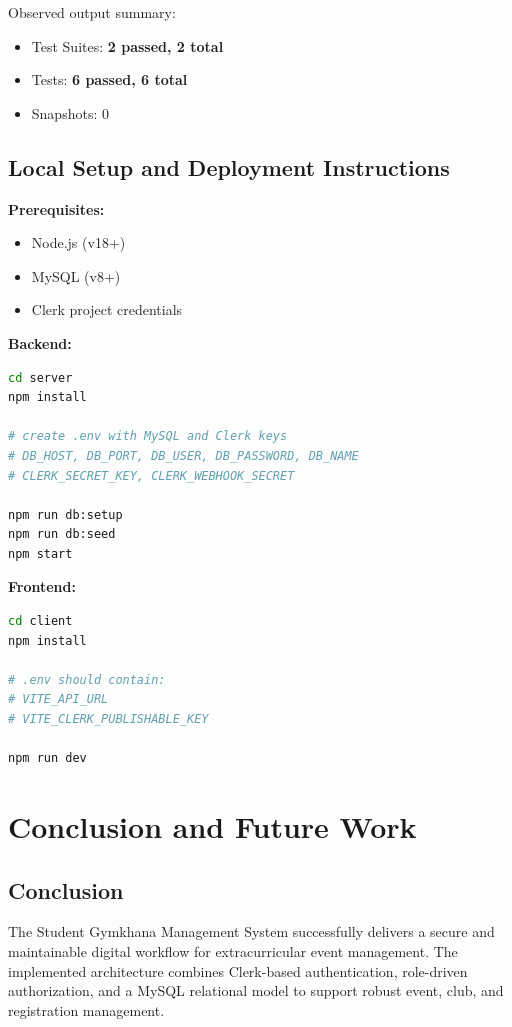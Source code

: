 \documentclass[12pt, a4paper]{article}
\begin{document}
Observed output summary:
\begin{itemize}
    \item Test Suites: \textbf{2 passed, 2 total}
    \item Tests: \textbf{6 passed, 6 total}
    \item Snapshots: 0
\end{itemize}

\subsection{Local Setup and Deployment Instructions}
\textbf{Prerequisites:}
\begin{itemize}
    \item Node.js (v18+)
    \item MySQL (v8+)
    \item Clerk project credentials
\end{itemize}

\textbf{Backend:}
\begin{lstlisting}[language=bash]
cd server
npm install

# create .env with MySQL and Clerk keys
# DB_HOST, DB_PORT, DB_USER, DB_PASSWORD, DB_NAME
# CLERK_SECRET_KEY, CLERK_WEBHOOK_SECRET

npm run db:setup
npm run db:seed
npm start
\end{lstlisting}

\textbf{Frontend:}
\begin{lstlisting}[language=bash]
cd client
npm install

# .env should contain:
# VITE_API_URL
# VITE_CLERK_PUBLISHABLE_KEY

npm run dev
\end{lstlisting}

\newpage
\section{Conclusion and Future Work}
\subsection{Conclusion}
The Student Gymkhana Management System successfully delivers a secure and maintainable digital workflow for extracurricular event management. The implemented architecture combines Clerk-based authentication, role-driven authorization, and a MySQL relational model to support robust event, club, and registration management.
\end{document}
